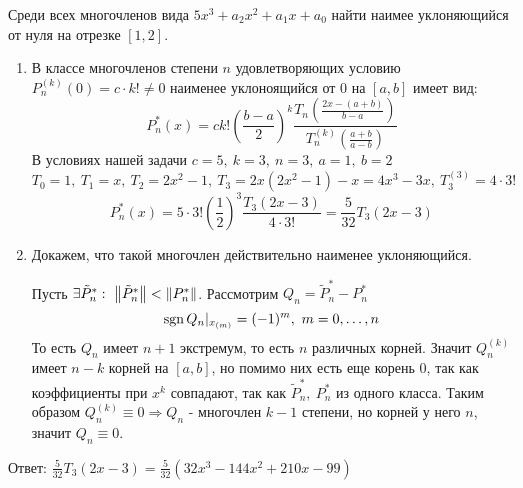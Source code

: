 \begin{task}
  Среди всех многочленов вида $5x^3+a_2x^2+a_1x+a_0$
  найти наимее уклоняющийся от нуля на отрезке $[1,2]$.

  \begin{enumerate}
    \item В классе многочленов степени $n$ удовлетворяющих
          условию $P_n^{(k)}(0)=c\cdot k!\neq0$
          наименее уклоноящийся от 0 на $[a,b]$ имеет вид:
          \[P_n^*(x)=ck!\left(\frac{b-a}{2}\right)^k\frac{T_n\left(\frac{2x-(a+b)}{b-a}\right)}{T_n^{(k)}\left(\frac{a+b}{a-b}\right)}\]
          В условиях нашей задачи $c=5,\ k=3,\ n=3,\ a=1,\ b=2$
          \[T_0=1,\ T_1=x,\ T_2=2x^2-1,\ T_3=2x(2x^2-1)-x=4x^3-3x,\ T_3^{(3)}=4\cdot3!\]
          \[P_n^*(x)=5\cdot 3!\left(\frac{1}{2}\right)^3\frac{T_3\left(2x-3\right)}{4\cdot3!}=\frac{5}{32} T_3(2x-3)\]
    \item Докажем, что такой многочлен действительно наименее уклоняющийся.

          Пусть $\exists \tilde{P}_n^*:\ \norm{\tilde{P}_n^*}<\norm{P_n^*}$. Рассмотрим $Q_n=\tilde{P}_n^*-P_n^*$
          \[\sgn Q_n|_{x_{(m)}}=(-1)^m,\ m=0,\ldots,n\]
          То есть $Q_n$ имеет $n+1$ экстремум, то есть $n$ различных корней.
          Значит $Q_n^{(k)}$ имеет $n-k$ корней на $[a,b]$, но помимо них есть еще корень $0$,
          так как коэффициенты при $x^k$ совпадают, так как $\tilde{P}_n^*,\ P_n^*$ из одного класса.
          Таким образом $Q_n^{(k)}\equiv 0\Rightarrow Q_n$ - многочлен $k-1$ степени, но
          корней у него $n$, значит $Q_n\equiv0$.
  \end{enumerate}

  Ответ: $\frac{5}{32} T_3(2x-3)=\frac{5}{32}(32x^3-144x^2+210x-99)$
\end{task}
